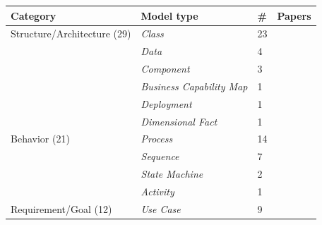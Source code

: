 \begin{tabular} {p{}  p{} p{} p{}} \\ 
\toprule 
Category & Model type & \# & Papers\\ 
\midrule  
Structure/Architecture (29) & \emph{Class} & 23 & \cite{ \papernineteenth,\papertwentyfourth,\paperfortyfirst,\paperfiftythird,\paperseventythird,\papereightysecond,\papereightyninth,\paperninetyninth,\paperonehundredthird,\paperonehundredeighth,\paperonehundredfourteenth,\paperonehundredsixteenth,\paperonehundredfortyeighth,\paperonehundredfiftyfifth,\paperonehundredfiftyninth,\paperonehundredseventythird,\paperonehundredeightyseventh,\paperonehundredninetyseventh,\papertwohundredtwentyfirst,\papertwohundredtwentyfourth,\papertwohundredtwentyeighth,\papertwohundredfortysecond,\papertwohundredfiftieth }\\ 
 & \emph{Data} & 4 & \cite{ \paperonehundredfortyeighth,\paperonehundredfiftysixth,\paperonehundredseventythird,\papertwohundredthirtysixth }\\ 
 & \emph{Component} & 3 & \cite{ \paperfortyfourth,\paperonehundredthirtyfifth,\paperonehundredfiftyninth }\\ 
 & \emph{Business Capability Map} & 1 & \cite{ \papertwentythird }\\ 
 & \emph{Deployment} & 1 & \cite{ \papertwohundredtwentyfourth }\\ 
 & \emph{Dimensional Fact} & 1 & \cite{ \paperonehundredfortyfifth }\\ 
\midrule  
Behavior (21) & \emph{Process} & 14 & \cite{ \papertwentyninth,\paperthirtyfirst,\paperninetieth,\paperonehundredtwentyninth,\paperonehundredfortieth,\paperonehundredfortyfirst,\paperonehundredfortythird,\paperonehundredfortyeighth,\paperonehundredfiftyfourth,\paperonehundredeightyfirst,\paperonehundredeightythird,\paperonehundredninetyeighth,\papertwohundredthirtysixth,\papertwohundredfortythird }\\ 
 & \emph{Sequence} & 7 & \cite{ \paperseventythird,\paperseventyfifth,\papereightysecond,\papertwohundredthird,\papertwohundredtwentysecond,\papertwohundredtwentyfourth,\papertwohundredfiftieth }\\ 
 & \emph{State Machine} & 2 & \cite{ \papertwohundredthird,\papertwohundredfiftieth }\\ 
 & \emph{Activity} & 1 & \cite{ \papertwohundredthird }\\ 
\midrule  
Requirement/Goal (12) & \emph{Use Case} & 9 & \cite{ \paperfifth,\papersixth,\papertwentyfourth,\paperfortyfirst,\paperseventythird,\paperonehundredfiftyninth,\paperonehundredsixtyeighth,\papertwohundredtwentyfourth,\papertwohundredfiftieth }\\ 

\end{tabular}
